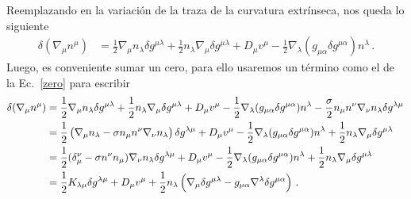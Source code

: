 \documentclass[../Main.tex]{subfiles}
\begin{document}
Reemplazando en la variación de la traza de la curvatura extrínseca, nos queda lo siguiente
\begin{align}
\delta (\nabla_{\mu}n^{\mu})&=\frac{1}{2}\nabla_{\mu}n_{\lambda}\delta g^{\mu\lambda}+\frac{1}{2}n_{\lambda}\nabla_{\mu}\delta g^{\mu\lambda}+D_{\mu}v^{\mu}-\frac{1}{2}\nabla_{\lambda}(g_{\mu\alpha}\delta g^{\mu\alpha})n^{\lambda}\, .
\end{align}
Luego, es conveniente sumar un cero, para ello usaremos un término como el de la Ec.~\eqref{zero} para escribir 
\begin{align}\notag
 \delta (\nabla_{\mu}n^{\mu})&=\frac{1}{2}\nabla_{\mu}n_{\lambda}\delta g^{\mu\lambda}+\frac{1}{2}n_{\lambda}\nabla_{\mu}\delta g^{\mu\lambda}+D_{\mu}v^{\mu}-\frac{1}{2}\nabla_{\lambda}(g_{\mu\alpha}\delta g^{\mu\alpha})n^{\lambda}-\frac{\sigma}{2}n_{\mu}n^{\nu}\nabla_{\nu}n_{\lambda}\delta g^{\lambda\mu}  \, \\ \notag
&=\frac{1}{2}\left(\nabla_{\mu}n_{\lambda}-\sigma n_{\mu}n^{\nu}\nabla_{\nu}n_{\lambda}\right)\delta g^{\lambda\mu}+D_{\mu}v^{\mu}-\frac{1}{2}\nabla_{\lambda}(g_{\mu\alpha}\delta g^{\mu\alpha})n^{\lambda}+\frac{1}{2}n_{\lambda}\nabla_{\mu}\delta g^{\mu\lambda}\\ \notag
&=\frac{1}{2}(\delta^{\nu}_{\mu}-\sigma n^{\nu}n_{\mu})\nabla_{\nu}n_{\lambda}\delta g^{\lambda\mu}+D_{\mu}v^{\mu}-\frac{1}{2}\nabla_{\lambda}(g_{\mu\alpha}\delta g^{\mu\alpha})n^{\lambda}+\frac{1}{2}n_{\lambda}\nabla_{\mu}\delta g^{\mu\lambda}\\
&=\frac{1}{2}K_{\lambda\mu}\delta g^{\lambda\mu}+D_{\mu}v^{\mu}+\frac{1}{2}n_{\lambda}\left(\nabla_{\mu}\delta g^{\mu\lambda}-g_{\mu\alpha}\nabla^{\lambda}\delta g^{\mu\alpha}\right)\, .
\end{align}
\end{document}
